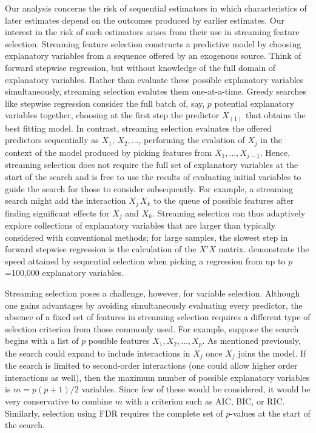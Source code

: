 \documentclass[12pt]{article}
\begin{document}
 Our analysis concerns the risk of sequential estimators in which
 characteristics of later estimates depend on the outcomes produced by earlier
 estimates.  Our interest in the risk of such estimators arises from their use
 in streaming feature selection.  Streaming feature selection constructs a
 predictive model by choosing explanatory variables from a sequence offered by
 an exogenous source.  Think of forward stepwise regression, but without
 knowledge of the full domain of explanatory variables.  Rather than evaluate
 these possible explanatory variables simultaneously, streaming selection
 evalutes them one-at-a-time.  Greedy searches like stepwise regression consider
 the full batch of, say, $p$ potential explanatory variables together, choosing
 at the first step the predictor $X_{(1)}$ that obtains the best fitting model.
  In contrast, streaming selection evaluates the offered predictors sequentially
 as $X_1, \, X_2, \ldots$, performing the evalation of $X_j$ in the context of
 the model produced by picking features from $X_1, \ldots, X_{j-1}$.  Hence,
 streaming selection does not require the full set of explanatory variables at
 the start of the search and is free to use the results of evaluating initial
 variables to guide the search for those to consider subsequently.  For example,
 a streaming search might add the interaction $X_j \, X_k$ to the queue of
 possible features after finding significant effects for $X_j$ and $X_k$.
  Streaming selection can thus adaptively explore collections of explanatory
 variables that are larger than typically considered with conventional methods;
 for large samples, the slowest step in forward stepwise regression is the
 calculation of the $X'X$ matrix.  \citet{fosterlin10} demonstrate the speed
 attained by sequential selection when picking a regression from up to
 $p$=100,000 explanatory variables.


 Streaming selection poses a challenge, however, for variable selection.
  Although one gains advantages by avoiding simultaneously evaluating every
 predictor, the absence of a fixed set of features in streaming selection
 requires a different type of selection criterion from those commonly used.  For
 example, suppose the search begins with a list of $p$ possible features $X_1,
 X_2, \ldots, X_p$.  As mentioned previously, the search could expand to include
 interactions in $X_j$ once $X_j$ joins the model.  If the search is limited to
 second-order interactions (one could allow higher order interactions as well),
 then the maximum number of possible explanatory variables is $m = p(p+1)/2$
 variables.  Since few of these would be considered, it would be very
 conservative to combine $m$ with a criterion such as AIC, BIC, or RIC.
  Similarly, selection using FDR requires the complete set of $p$-values at the
 start of the search.
\end{document}
